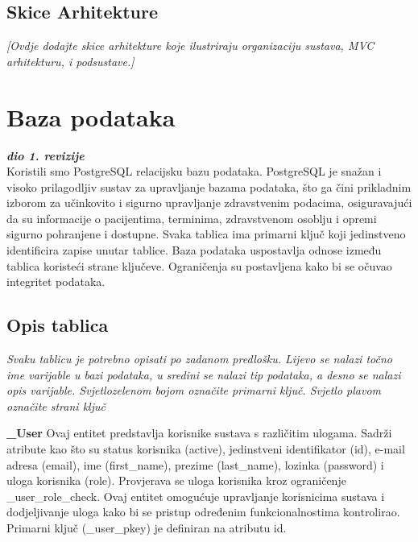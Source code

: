 \subsection*{Skice Arhitekture}
\textit{[Ovdje dodajte skice arhitekture koje ilustriraju organizaciju sustava, MVC arhitekturu, i podsustave.]}

		\section{Baza podataka}
			
			\textbf{\textit{dio 1. revizije}}\\
			
Koristili smo PostgreSQL relacijsku bazu podataka. PostgreSQL je snažan i visoko prilagodljiv sustav za upravljanje bazama podataka, što ga čini prikladnim izborom za učinkovito i sigurno upravljanje zdravstvenim podacima, osiguravajući da su informacije o pacijentima, terminima, zdravstvenom osoblju i opremi sigurno pohranjene i dostupne. 
Svaka tablica ima primarni ključ koji jedinstveno identificira zapise unutar tablice. Baza podataka uspostavlja odnose između tablica koristeći strane ključeve. Ograničenja su postavljena kako bi se očuvao integritet podataka.  
		
			\subsection{Opis tablica}
			

				\textit{Svaku tablicu je potrebno opisati po zadanom predlošku. Lijevo se nalazi točno ime varijable u bazi podataka, u sredini se nalazi tip podataka, a desno se nalazi opis varijable. Svjetlozelenom bojom označite primarni ključ. Svjetlo plavom označite strani ključ}
				
\textbf{\_User } Ovaj entitet predstavlja korisnike sustava s različitim ulogama.  Sadrži atribute kao što su status korisnika (active), jedinstveni identifikator (id), e-mail adresa (email), ime (first\_name), prezime (last\_name), lozinka (password) i uloga korisnika (role). Provjerava se uloga korisnika kroz ograničenje \_user\_role\_check. Ovaj entitet omogućuje upravljanje korisnicima sustava i dodjeljivanje uloga kako bi se pristup određenim funkcionalnostima kontrolirao.  Primarni ključ (\_user\_pkey) je definiran na atributu id. 

